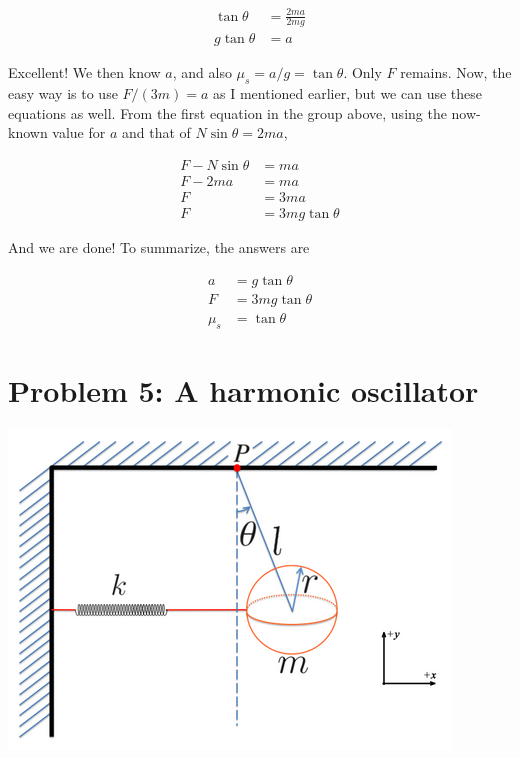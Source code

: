 \documentclass[8.01x]{subfiles}
\begin{document}
\begin{align}
\tan \theta &= \frac{2 ma}{2 m g}\\
g \tan \theta &= a
\end{align}

Excellent! We then know $a$, and also $\mu_s = a/g = \tan \theta$. Only $F$ remains. Now, the easy way is to use $F/(3m) = a$ as I mentioned earlier, but we can use these equations as well. From the first equation in the group above, using the now-known value for $a$ and that of $N \sin \theta = 2 m a$,

\begin{align}
F - N \sin \theta &= m a\\
F - 2 m a &= m a\\
F &= 3 m a\\
F &= 3 m g \tan \theta
\end{align}

And we are done! To summarize, the answers are

\begin{align}
a &= g \tan \theta\\
F &= 3 m g \tan \theta\\
\mu_s &= \tan \theta
\end{align}

\section{Problem 5: A harmonic oscillator}

\begin{center}
\includegraphics[scale=0.65]{Graphics/finalexam_p5}
\end{center}
\end{document}

